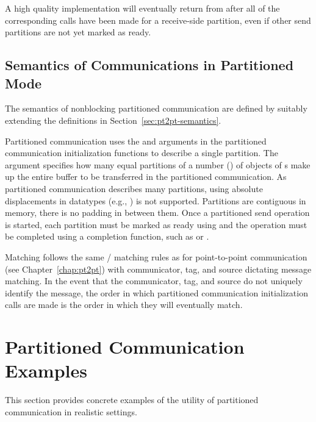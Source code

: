 \begin{implementors}
A high quality implementation will eventually return  from  after all of the corresponding
 calls have been made for a receive-side partition, 
even if other send partitions are not yet marked as ready. 
\end{implementors}

\subsection{Semantics of Communications in Partitioned Mode}
\label{subsec:part-semantics}

The semantics of nonblocking partitioned communication are defined by suitably extending the
definitions in Section~\ref{sec:pt2pt-semantics}.

Partitioned communication uses the  and 
arguments in the partitioned communication initialization functions to describe
a single partition. The argument  specifies how many equal
partitions of a number () of objects of s make up the
entire buffer to be transferred in the partitioned communication. As partitioned
communication describes many partitions, using absolute displacements in datatypes
(e.g., ) is not supported. Partitions are contiguous in memory, there
is no padding in between them.
Once a partitioned send operation is started, each partition must be marked as ready
using  and the operation must be completed using a completion
function, such as  or .


Matching follows the same \MPI/ matching rules as for point-to-point communication (see Chapter~\ref{chap:pt2pt}) with communicator, tag, and source dictating
message matching. In the event that the communicator, tag, and source do not
uniquely identify the message, the order in which partitioned 
communication initialization calls are made is the order in which they will eventually match.

\section{Partitioned Communication Examples}
\label{sec:part-communication-examples}
This section provides concrete examples of the utility of partitioned communication
in realistic settings.
